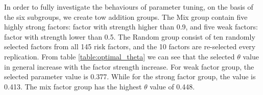 In order to fully investigate the behaviours of parameter tuning, on the basis of the six subgroups, we create tow addition groups.
The Mix group contain five highly strong factors: factor with strength higher than 0.9, and five weak factors: factor with strength lower than 0.5.
The Random group consist of ten randomly selected factors from all 145 risk factors, and the 10 factors are re-selected every replication.
From table \ref{table:optimal_theta} we can see that the selected $\theta$ value in general increase with the factor strength increase.
For weak factor group, the selected parameter value is 0.377.
While for the strong factor group, the value is 0.413.
The mix factor group has the highest $\theta$ value of 0.448.




